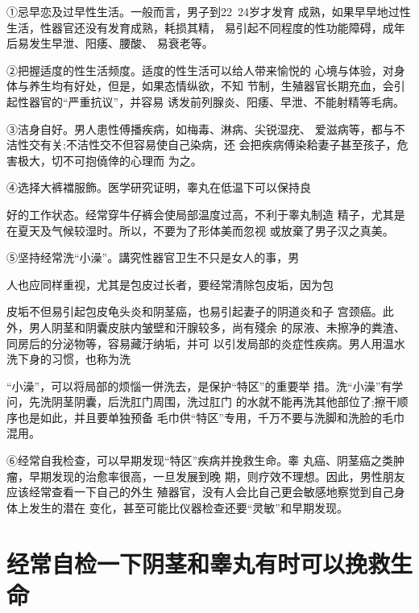 \documentclass[12pt,UTF8]{ctexbook}
\begin{document}
①忌早恋及过早性生活。一般而言，男子到22~24岁才发育
成熟，如果早早地过性生活，性器官还没有发育成熟，耗损其精，
易引起不同程度的性功能障碍，成年后易发生早泄、阳痿、腰酸、
易衰老等。

②把握适度的性生活频度。适度的性生活可以给人带来愉悦的
心境与体验，对身体与养生均有好处，但是，如果态情纵欲，不知
节制，生殖器官长期充血，会引起性器官的“严重抗议”，并容易
诱发前列腺炎、阳痿、早泄、不能射精等毛病。

③洁身自好。男人患性傅播疾病，如梅毒、淋病、尖锐湿疣、
爱滋病等，都与不洁性交有关;不洁性交不但容易使自己染病，还
会把疾病傅染耠妻子甚至孩子，危害极大，切不可抱僥倖的心理而
为之。

④选择大裤襠服飾。医学研究证明，睾丸在低温下可以保持良

好的工作状态。经常穿牛仔裤会使局部温度过高，不利于睾丸制造
精子，尤其是在夏天及气候较湿时。所以，不要为了形体美而忽视
或放棄了男子汉之真美。

⑤坚持经常洗“小澡”。講究性器官卫生不只是女人的事，男

人也应同样重视，尤其是包皮过长者，要经常清除包皮垢，因为包

皮垢不但易引起包皮龟头炎和阴茎癌，也易引起妻子的阴道炎和子
宫颈癌。此外，男人阴茎和阴囊皮肤内皱壁和汗腺较多，尚有殘余
的尿液、未擦净的粪渣、同房后的分泌物等，容易藏汙纳垢，并可
以引发局部的炎症性疾病。男人用温水洗下身的习惯，也称为洗

“小澡”，可以将局部的烦惱一併洗去，是保护“特区”的重要举
措。洗“小澡”有学问，先洗阴茎阴囊，后洗肛门周围，洗过肛门
的水就不能再洗其他部位了;擦干顺序也是如此，并且要单独预备
毛巾供“特区”专用，千万不要与洗脚和洗脸的毛巾混用。

⑥经常自我检查，可以早期发现“特区”疾病并挽救生命。睾
丸癌、阴茎癌之类肿瘤，早期发现的治愈率很高，一旦发展到晚
期，则疗效不理想。因此，男性朋友应该经常查看一下自己的外生
殖器官，没有人会比自己更会敏感地察觉到自己身体上发生的潜在
变化，甚至可能比仪器检查还要“灵敏”和早期发现。

\section{经常自检一下阴茎和睾丸有时可以挽救生命}
\end{document}
